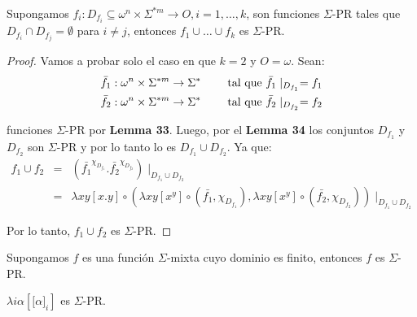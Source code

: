 
  \begin{lemma}
    \PN Supongamos $f_{i}: D_{f_{i}} \subseteq \omega^{n} \times \Sigma^{\ast m} \rightarrow O, i = 1, \dotsc, k$, son
    funciones $\Sigma$-PR tales que $D_{f_{i}} \cap D_{f_{j}} = \emptyset$ para $i \neq j$, entonces $f_{1} \cup \dotsc
    \cup f_{k}$ es $\Sigma$-PR.
  \end{lemma}
  \begin{proof}
    \PN Vamos a probar solo el caso en que $k = 2$ y $O = \omega$. Sean:
    \begin{eqnarray*}
      \bar{f}_{1}: \omega^{n} \times \Sigma^{\ast m} \rightarrow \Sigma^{\ast} \qquad \text{ tal que } \bar{f}_{1}
        \mid_{D_{f_{1}}} = f_{1} \\
      \bar{f}_{2}: \omega^{n} \times \Sigma^{\ast m} \rightarrow \Sigma^{\ast} \qquad \text{ tal que } \bar{f}_{2}
        \mid_{D_{f_{2}}} = f_{2}
    \end{eqnarray*}

    \PN funciones $\Sigma$-PR por \textbf{Lemma 33}. Luego, por el \textbf{Lemma 34} los conjuntos $D_{f_{1}}$ y
    $D_{f_{2}}$ son $\Sigma$-PR y por lo tanto lo es $ D_{f_{1}} \cup D_{f_{2}}$. Ya que:
    \begin{eqnarray*}
      f_{1} \cup f_{2} &=& \left(\bar{f_{1}}^{\chi_{D_{f_{1}}}} . \bar{f_{2}}^{\chi_{D_{f_{2}}}}\right)
        \mid_{D_{f_{1}} \cup D_{f_{2}}} \\
      &=& \lambda xy \left[x.y\right] \circ \left(\lambda xy \left[x^{y}\right] \circ (\bar{f_{1}},
        \chi_{D_{f_{1}}}), \lambda xy \left[x^{y}\right] \circ (\bar{f_{2}}, \chi_{D_{f_{2}}}) \right) \mid_{D_{f_{1}}
        \cup D_{f_{2}}}
    \end{eqnarray*}

    \PN Por lo tanto, $f_{1} \cup f_{2}$ es $\Sigma$-PR.
  \end{proof}

  \begin{corollary}
    \PN Supongamos $f$ es una función $\Sigma$-mixta cuyo dominio es finito, entonces $f$ es $\Sigma$-PR.
  \end{corollary}

  \begin{lemma}
    \PN $\lambda i\alpha \left[\lbrack \alpha]_{i}\right]$ es $\Sigma$-PR.
  \end{lemma}

